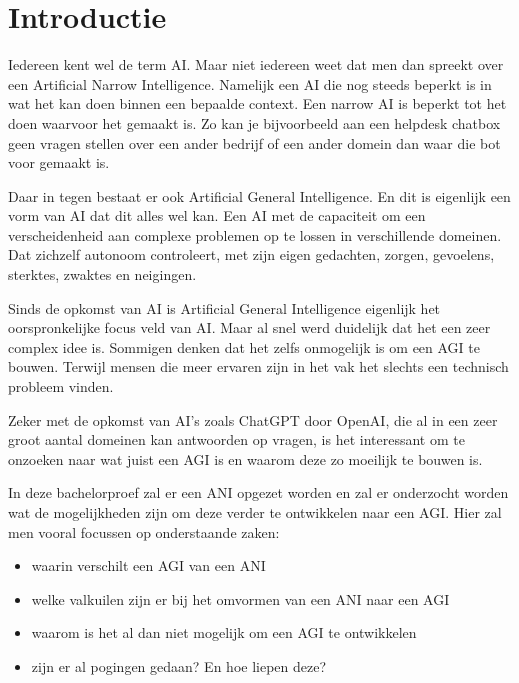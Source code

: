 
\section{Introductie} %
\label{sec:introductie}

Iedereen kent wel de term AI. Maar niet iedereen weet dat men dan spreekt over een Artificial Narrow Intelligence. Namelijk een AI die nog steeds beperkt is in wat het kan doen binnen een bepaalde context. Een narrow AI is beperkt tot het doen waarvoor het gemaakt is. Zo kan je bijvoorbeeld aan een helpdesk chatbox geen vragen stellen over een ander bedrijf of een ander domein dan waar die bot voor gemaakt is. \linebreak

Daar in tegen bestaat er ook Artificial General Intelligence. En dit is eigenlijk een vorm van AI dat dit alles wel kan. Een AI met de capaciteit om een verscheidenheid aan complexe problemen op te lossen in verschillende domeinen. Dat zichzelf autonoom controleert, met zijn eigen gedachten, zorgen, gevoelens, sterktes, zwaktes en neigingen. \linebreak

Sinds de opkomst van AI is Artificial General Intelligence eigenlijk het oorspronkelijke focus veld van AI. Maar al snel werd duidelijk dat het een zeer complex idee is. Sommigen denken dat het zelfs onmogelijk is om een AGI te bouwen. Terwijl mensen die meer ervaren zijn in het vak het slechts een technisch probleem vinden. \linebreak

Zeker met de opkomst van AI's zoals ChatGPT door OpenAI, die al in een zeer groot aantal domeinen kan antwoorden op vragen, is het interessant om te onzoeken naar wat juist een AGI is en waarom deze zo moeilijk te bouwen is. \linebreak

In deze bachelorproef zal er een ANI opgezet worden en zal er onderzocht worden wat de mogelijkheden zijn om deze verder te ontwikkelen naar een AGI. Hier zal men vooral focussen op onderstaande zaken: \linebreak

\begin{itemize}
    \item waarin verschilt een AGI van een ANI
    \item welke valkuilen zijn er bij het omvormen van een ANI naar een AGI
    \item waarom is het al dan niet mogelijk om een AGI te ontwikkelen
    \item zijn er al pogingen gedaan? En hoe liepen deze?
\end{itemize}

